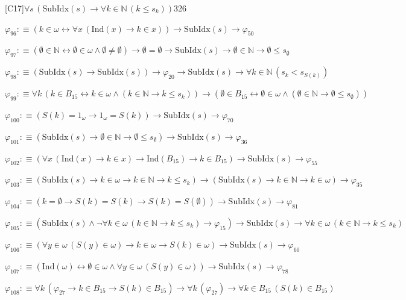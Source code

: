 \begin{fullproof}{[C17]}{$\forall s\,(\mathrm{SubIdx}(s) \to \forall k \in \mathbb{N}\,(k \leq s_{k}))$}{326}
\begin{abbrevlist}
\item $\varphi_{96} :\equiv (k \in \omega \leftrightarrow \forall x\,(\mathrm{Ind}(x) \to k \in x)) \to \mathrm{SubIdx}(s) \to \varphi_{50}$
\item $\varphi_{97} :\equiv (\emptyset \in \mathbb{N} \leftrightarrow \emptyset \in \omega \land \emptyset \neq \emptyset) \to \emptyset = \emptyset \to \mathrm{SubIdx}(s) \to \emptyset \in \mathbb{N} \to \emptyset \leq s_{\emptyset}$
\item $\varphi_{98} :\equiv (\mathrm{SubIdx}(s) \to \mathrm{SubIdx}(s)) \to \varphi_{20} \to \mathrm{SubIdx}(s) \to \forall k \in \mathbb{N}\,(s_{k} < s_{S(k)})$
\item $\varphi_{99} :\equiv \forall k\,(k \in B_{15} \leftrightarrow k \in \omega \land (k \in \mathbb{N} \to k \leq s_{k})) \to (\emptyset \in B_{15} \leftrightarrow \emptyset \in \omega \land (\emptyset \in \mathbb{N} \to \emptyset \leq s_{\emptyset}))$
\item $\varphi_{100} :\equiv (S(k) = 1_{\omega} \to 1_{\omega} = S(k)) \to \mathrm{SubIdx}(s) \to \varphi_{70}$
\item $\varphi_{101} :\equiv (\mathrm{SubIdx}(s) \to \emptyset \in \mathbb{N} \to \emptyset \leq s_{\emptyset}) \to \mathrm{SubIdx}(s) \to \varphi_{36}$
\item $\varphi_{102} :\equiv (\forall x\,(\mathrm{Ind}(x) \to k \in x) \to \mathrm{Ind}(B_{15}) \to k \in B_{15}) \to \mathrm{SubIdx}(s) \to \varphi_{55}$
\item $\varphi_{103} :\equiv (\mathrm{SubIdx}(s) \to k \in \omega \to k \in \mathbb{N} \to k \leq s_{k}) \to (\mathrm{SubIdx}(s) \to k \in \mathbb{N} \to k \in \omega) \to \varphi_{35}$
\item $\varphi_{104} :\equiv (k = \emptyset \to S(k) = S(k) \to S(k) = S(\emptyset)) \to \mathrm{SubIdx}(s) \to \varphi_{81}$
\item $\varphi_{105} :\equiv (\mathrm{SubIdx}(s) \land \neg \forall k \in \omega\,(k \in \mathbb{N} \to k \leq s_{k}) \to \varphi_{15}) \to \mathrm{SubIdx}(s) \to \forall k \in \omega\,(k \in \mathbb{N} \to k \leq s_{k})$
\item $\varphi_{106} :\equiv (\forall y \in \omega\,(S(y) \in \omega) \to k \in \omega \to S(k) \in \omega) \to \mathrm{SubIdx}(s) \to \varphi_{60}$
\item $\varphi_{107} :\equiv (\mathrm{Ind}(\omega) \leftrightarrow \emptyset \in \omega \land \forall y \in \omega\,(S(y) \in \omega)) \to \mathrm{SubIdx}(s) \to \varphi_{78}$
\item $\varphi_{108} :\equiv \forall k\,(\varphi_{27} \to k \in B_{15} \to S(k) \in B_{15}) \to \forall k\,(\varphi_{27}) \to \forall k \in B_{15}\,(S(k) \in B_{15})$

\end{abbrevlist}
\end{fullproof}

